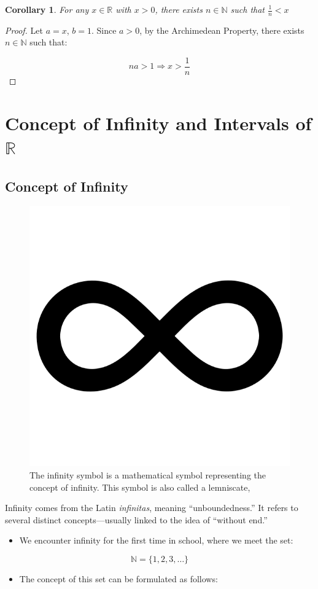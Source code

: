 \documentclass[
]{book}
\providecommand{\tightlist}{%
  \setlength{\itemsep}{0pt}\setlength{\parskip}{0pt}}
\newtheorem{corollary}{Corollary}[chapter]
\theoremstyle{definition}
\theoremstyle{definition}
\theoremstyle{definition}
\theoremstyle{definition}
\theoremstyle{remark}
\begin{document}
\begin{corollary}
\protect\hypertarget{cor:unnamed-chunk-116}{}\label{cor:unnamed-chunk-116}For any \(x \in \mathbb{R}\) with \(x > 0\), there exists \(n \in \mathbb{N}\) such that \(\frac{1}{n} < x\)
\end{corollary}

\begin{proof}
Let \(a = x\), \(b = 1\). Since \(a > 0\), by the Archimedean Property, there exists \(n \in \mathbb{N}\) such that:

\[
na > 1 \Rightarrow x > \frac{1}{n}
\]
\end{proof}

\section{\texorpdfstring{Concept of Infinity and Intervals of \(\mathbb{R}\)}{Concept of Infinity and Intervals of \textbackslash mathbb\{R\}}}\label{concept-of-infinity-and-intervals-of-mathbbr}

\subsection{Concept of Infinity}\label{concept-of-infinity}

\begin{figure}
\centering
\includegraphics[width=0.2\linewidth,height=\textheight,keepaspectratio]{fig/fig8.png}
\caption{The infinity symbol is a mathematical symbol representing the concept of infinity. This symbol is also called a lemniscate,}
\end{figure}

Infinity comes from the Latin \emph{infinitas}, meaning ``unboundedness.'' It refers to several distinct concepts---usually linked to the idea of ``without end.''

\begin{itemize}
\tightlist
\item
  We encounter infinity for the first time in school, where we meet the set:
\end{itemize}

\[
\mathbb{N} = \{1, 2, 3, \dots\}
\]

\begin{itemize}
\tightlist
\item
  The concept of this set can be formulated as follows:
\end{itemize}
\end{document}
